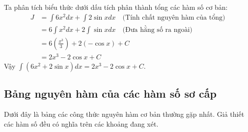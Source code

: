 \documentclass[12pt]{article}
\begin{document}
	\begin{loigiai}
		Ta phân tích biểu thức dưới dấu tích phân thành tổng các hàm số cơ bản:
		\begin{align*}
			J &= \int 6x^2 dx + \int 2\sin x dx \quad \text{(Tính chất nguyên hàm của tổng)} \\
			&= 6\int x^2 dx + 2\int \sin x dx \quad \text{(Đưa hằng số ra ngoài)} \\
			&= 6 \left( \frac{x^3}{3} \right) + 2 \left( -\cos x \right) + C \\
			&= 2x^3 - 2\cos x + C
		\end{align*}
		Vậy $\int \left( 6x^2 + 2\sin x \right) dx = 2x^3 - 2\cos x + C$.
	\end{loigiai}
	
	\subsection{Bảng nguyên hàm của các hàm số sơ cấp}
	
	Dưới đây là bảng các công thức nguyên hàm cơ bản thường gặp nhất. Giả thiết các hàm số đều có nghĩa trên các khoảng đang xét.
	
\end{document}

